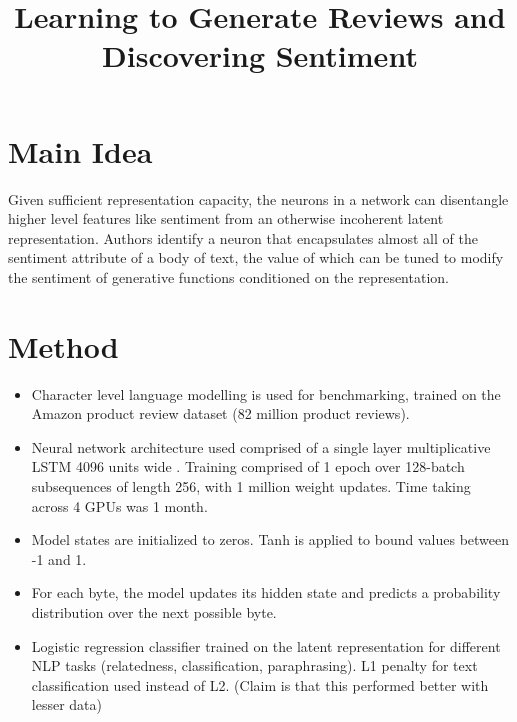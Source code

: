 \documentclass[12pt]{scrartcl}
\begin{document}
\title{Learning to Generate Reviews and Discovering Sentiment}
\author{}
\date{}
\maketitle

\section{Main Idea}
  Given sufficient representation capacity, the neurons in a network can disentangle higher level features like sentiment from an otherwise incoherent latent representation. Authors identify a neuron that encapsulates almost all of the sentiment attribute of a body of text, the value of which can be tuned to modify the sentiment of generative functions conditioned on the representation.

\section{Method}
  \begin{itemize}
    \item Character level language modelling is used for benchmarking, trained on the Amazon product review dataset (82 million product reviews).
    \item Neural network architecture used comprised of a single layer multiplicative LSTM 4096 units wide \cite{krause2016multiplicative}. Training comprised of 1 epoch over 128-batch subsequences of length 256, with 1 million weight updates. Time taking across 4 GPUs was 1 month.
    \item Model states are initialized to zeros.  Tanh is applied to bound values between -1 and 1.
    \item For each byte, the model updates its hidden state and predicts a probability distribution over the next possible byte.
    \item Logistic regression classifier trained on the latent representation for different NLP tasks (relatedness, classification, paraphrasing). L1 penalty for text classification used instead of L2. (Claim is that this performed better with lesser data)
  \end{itemize}
\end{document}
